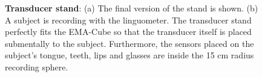 \begin{figure}
	\centering
		\hspace{0.05\textwidth}

	\caption[Transducer stand]{\textbf{Transducer stand}:
	(a) The final version of the stand is shown.
	(b) A subject is recording with the linguometer. The transducer stand
	perfectly fits the EMA-Cube so that the transducer itself is placed
	submentally to the subject. Furthermore, the sensors placed on the
	subject's tongue, teeth, lips and glasses are inside the 15 cm radius 
	recording sphere.
	}
	\label{fig:linguometer:od:subject}
\end{figure}
